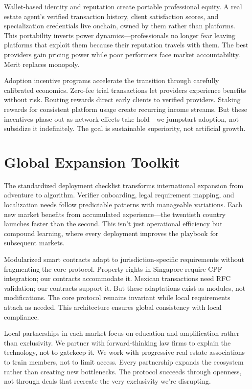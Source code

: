 Wallet-based identity and reputation create portable professional equity. A real estate agent's verified transaction history, client satisfaction scores, and specialization credentials live onchain, owned by them rather than platforms. This portability inverts power dynamics—professionals no longer fear leaving platforms that exploit them because their reputation travels with them. The best providers gain pricing power while poor performers face market accountability. Merit replaces monopoly.

Adoption incentive programs accelerate the transition through carefully calibrated economics. Zero-fee trial transactions let providers experience benefits without risk. Routing rewards direct early clients to verified providers. Staking rewards for consistent platform usage create recurring income streams. But these incentives phase out as network effects take hold—we jumpstart adoption, not subsidize it indefinitely. The goal is sustainable superiority, not artificial growth.

\section{Global Expansion Toolkit}

The standardized deployment checklist transforms international expansion from adventure to algorithm. Verifier onboarding, legal requirement mapping, and localization needs follow predictable patterns with manageable variations. Each new market benefits from accumulated experience—the twentieth country launches faster than the second. This isn't just operational efficiency but compound learning, where every deployment improves the playbook for subsequent markets.

Modularized smart contracts adapt to jurisdiction-specific requirements without fragmenting the core protocol. Property rights in Singapore require CPF integration; our contracts accommodate it. Mexican transactions need RFC validation; our contracts support it. But these adaptations exist as modules, not modifications. The core protocol remains invariant while local requirements attach as needed. This architecture ensures global consistency with local compliance.

Local partnerships in each market focus on education and amplification rather than exclusivity. We partner with forward-thinking law firms to explain the technology, not to gatekeep it. We work with progressive real estate associations to train members, not to limit access. Every partnership expands the ecosystem rather than creating new bottlenecks. The protocol succeeds through openness, not through deals that recreate the very exclusivity we're disrupting.

